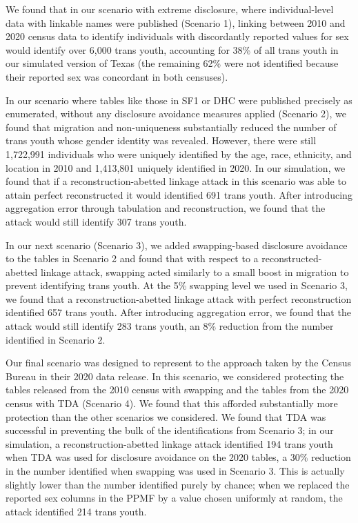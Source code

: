\documentclass{jpc} %
\theoremstyle{plain}\newtheorem{satz}[thm]{Satz} %
\begin{document}
We found that in our scenario with extreme disclosure, where individual-level data with linkable names were published (Scenario 1), linking between 2010 and 2020 census data to identify individuals with discordantly reported values for sex would identify over 6,000 trans youth, accounting for 38\% of all trans youth in our simulated version of Texas (the remaining 62\% were not identified because their reported sex was concordant in both censuses).

In our scenario where tables like those in SF1 or DHC were published precisely as enumerated, without any disclosure avoidance measures applied (Scenario 2), we found that migration and non-uniqueness substantially reduced the number of trans youth whose gender identity was revealed.  However, there were still 1,722,991 individuals who were uniquely identified by the age, race, ethnicity, and location in 2010 and 1,413,801 uniquely identified in 2020.  In our simulation, we found that if a reconstruction-abetted linkage attack in this scenario was able to attain perfect reconstructed it would identified 691 trans youth.  After introducing aggregation error through tabulation and reconstruction, we found that the attack would still identify 307 trans youth.

In our next scenario (Scenario 3), we added swapping-based disclosure avoidance to the tables in Scenario 2 and found that with respect to a reconstructed-abetted linkage attack, swapping acted similarly to a small boost in migration to prevent identifying trans youth.  At the 5\% swapping level we used in Scenario 3, we found that a reconstruction-abetted linkage attack with perfect reconstruction identified 657 trans youth.  After introducing aggregation error, we found that the attack would still identify 283 trans youth, an 8\% reduction from the number identified in Scenario 2.

Our final scenario was designed to represent to the approach taken by the Census Bureau in their 2020 data release. In this scenario, we considered protecting the tables released from the 2010 census with swapping and the tables from the 2020 census with TDA (Scenario 4).  We found that this afforded substantially more protection than the other scenarios we considered.  We found that TDA was successful in preventing the bulk of the identifications from Scenario 3; in our simulation, a reconstruction-abetted linkage attack identified 194 trans youth when TDA was used for disclosure avoidance on the 2020 tables, a 30\% reduction in the number identified when swapping was used in Scenario 3.  This is actually slightly lower than the number identified purely by chance; when we replaced the reported sex columns in the PPMF by a value chosen uniformly at random, the attack identified 214 trans youth.
\end{document}
